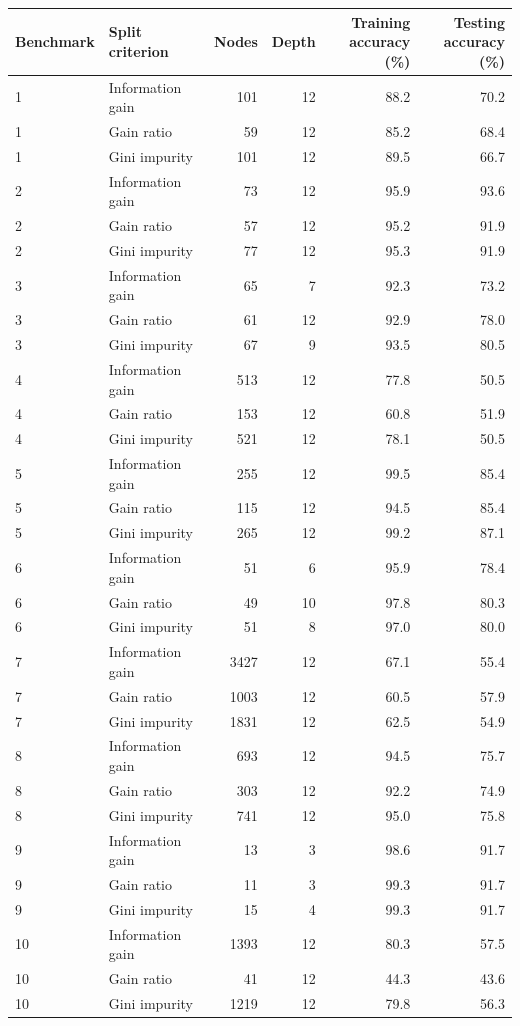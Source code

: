 \begin{tabular}{@{}llrrrr@{}}
\toprule
Benchmark & Split criterion & Nodes & Depth & \shortstack{Training\\accuracy (\%)} & \shortstack{Testing\\accuracy (\%)} \\
\midrule
1 & Information gain & 101 & 12 & 88.2 & 70.2 \\
1 & Gain ratio & 59 & 12 & 85.2 & 68.4 \\
1 & Gini impurity & 101 & 12 & 89.5 & 66.7 \\
2 & Information gain & 73 & 12 & 95.9 & 93.6 \\
2 & Gain ratio & 57 & 12 & 95.2 & 91.9 \\
2 & Gini impurity & 77 & 12 & 95.3 & 91.9 \\
3 & Information gain & 65 & 7 & 92.3 & 73.2 \\
3 & Gain ratio & 61 & 12 & 92.9 & 78.0 \\
3 & Gini impurity & 67 & 9 & 93.5 & 80.5 \\
4 & Information gain & 513 & 12 & 77.8 & 50.5 \\
4 & Gain ratio & 153 & 12 & 60.8 & 51.9 \\
4 & Gini impurity & 521 & 12 & 78.1 & 50.5 \\
5 & Information gain & 255 & 12 & 99.5 & 85.4 \\
5 & Gain ratio & 115 & 12 & 94.5 & 85.4 \\
5 & Gini impurity & 265 & 12 & 99.2 & 87.1 \\
6 & Information gain & 51 & 6 & 95.9 & 78.4 \\
6 & Gain ratio & 49 & 10 & 97.8 & 80.3 \\
6 & Gini impurity & 51 & 8 & 97.0 & 80.0 \\
7 & Information gain & 3427 & 12 & 67.1 & 55.4 \\
7 & Gain ratio & 1003 & 12 & 60.5 & 57.9 \\
7 & Gini impurity & 1831 & 12 & 62.5 & 54.9 \\
8 & Information gain & 693 & 12 & 94.5 & 75.7 \\
8 & Gain ratio & 303 & 12 & 92.2 & 74.9 \\
8 & Gini impurity & 741 & 12 & 95.0 & 75.8 \\
9 & Information gain & 13 & 3 & 98.6 & 91.7 \\
9 & Gain ratio & 11 & 3 & 99.3 & 91.7 \\
9 & Gini impurity & 15 & 4 & 99.3 & 91.7 \\
10 & Information gain & 1393 & 12 & 80.3 & 57.5 \\
10 & Gain ratio & 41 & 12 & 44.3 & 43.6 \\
10 & Gini impurity & 1219 & 12 & 79.8 & 56.3 \\
\bottomrule
\end{tabular}
